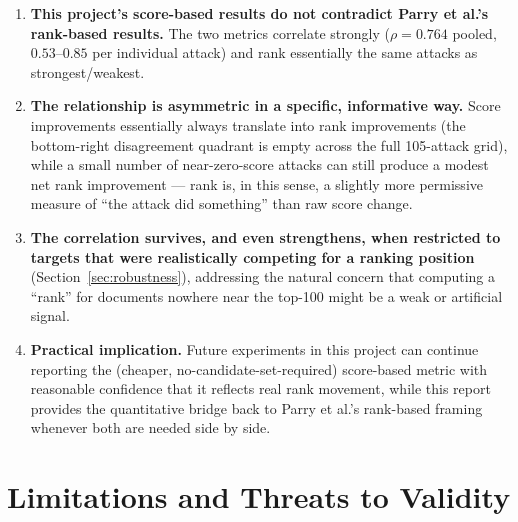 \documentclass[11pt]{article}
\begin{document}
\begin{enumerate}
  \item \textbf{This project's score-based results do not contradict
        Parry et al.'s rank-based results.} The two metrics correlate
        strongly ($\rho=0.764$ pooled, $0.53$--$0.85$ per individual
        attack) and rank essentially the same attacks as strongest/weakest.
  \item \textbf{The relationship is asymmetric in a specific, informative
        way.} Score improvements essentially always translate into rank
        improvements (the bottom-right disagreement quadrant is empty
        across the full 105-attack grid), while a small number of
        near-zero-score attacks can still produce a modest net rank
        improvement --- rank is, in this sense, a slightly more permissive
        measure of ``the attack did something'' than raw score change.
  \item \textbf{The correlation survives, and even strengthens, when
        restricted to targets that were realistically competing for a
        ranking position} (Section~\ref{sec:robustness}), addressing the
        natural concern that computing a ``rank'' for documents nowhere
        near the top-100 might be a weak or artificial signal.
  \item \textbf{Practical implication.} Future experiments in this project
        can continue reporting the (cheaper, no-candidate-set-required)
        score-based metric with reasonable confidence that it reflects real
        rank movement, while this report provides the quantitative bridge
        back to Parry et al.'s rank-based framing whenever both are needed
        side by side.
\end{enumerate}

\section{Limitations and Threats to Validity}
\end{document}
